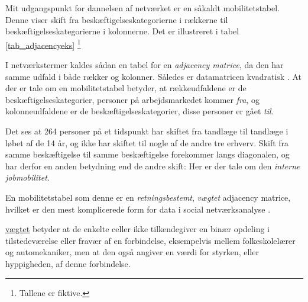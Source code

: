 Mit udgangspunkt for dannelsen af netværket er en såkaldt mobilitetstabel. Denne viser skift fra beskæftigelseskategorierne i rækkerne til beskæftigelseskategorierne i kolonnerne. Det er illustreret i tabel \ref{tab_adjacencyeks}%
%
		\footnote{ Tallene er fiktive.}%
%


%
\begin{table}[H] \centering
\caption{Eksempel på en adjacency matrice}
\label{tab_adjacencyeks}
\end{table}
% 

I netværkstermer kaldes sådan en tabel for en \emph{adjacency matrice}, da den har samme udfald i både rækker og kolonner. Således er datamatricen kvadratisk \parencite[55]{Scott2000}. At der er tale om en mobilitetstabel betyder, at rækkeudfaldene er de beskæftigelseskategorier, personer på arbejdsmarkedet kommer \emph{fra}, og kolonneudfaldene er de beskæftigelseskategorier, disse personer er gået \emph{til}. 

Det ses at 264 personer på et tidspunkt har skiftet fra tandlæge til tandlæge i løbet af de 14 år, og ikke har skiftet til nogle af de andre tre erhverv. Skift fra samme beskæftigelse til samme beskæftigelse forekommer langs diagonalen, og har derfor en anden betydning end de andre skift: Her er der tale om den \emph{interne jobmobilitet}. 

En mobilitetstabel som denne er en \emph{retningsbestemt}, \emph{vægtet} adjacency matrice, hvilket er den mest komplicerede form for  data i social netværksanalyse \parencite[61]{Scott2000}. 


\underline{vægtet} betyder at de enkelte celler ikke tilkendegiver en binær opdeling i tilstedeværelse eller fravær af en forbindelse, eksempelvis mellem folkeskolelærer og automekaniker, men at den også angiver en værdi for styrken, eller hyppigheden, af denne forbindelse. 

